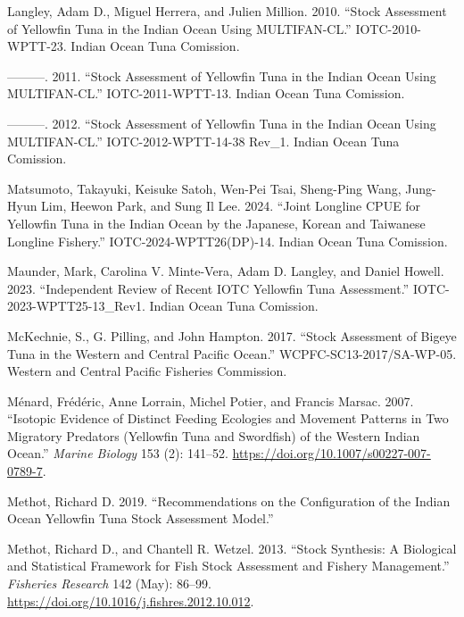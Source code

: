 \documentclass[
]{scrartcl}
\newlength{\cslhangindent}
\newenvironment{CSLReferences}[2] %
 {\begin{list}{}{%
  \setlength{\itemindent}{0pt}
  \setlength{\leftmargin}{0pt}
  \setlength{\parsep}{0pt}
  \ifodd #1
   \setlength{\leftmargin}{\cslhangindent}
   \setlength{\itemindent}{-1\cslhangindent}
  \fi
  \setlength{\itemsep}{#2\baselineskip}}}
 {\end{list}}
\begin{document}
\begin{CSLReferences}{1}{0}
Langley, Adam D., Miguel Herrera, and Julien Million. 2010. {``Stock
Assessment of Yellowfin Tuna in the {Indian Ocean} Using
{MULTIFAN-CL}.''} IOTC-2010-WPTT-23. Indian Ocean Tuna Comission.

---------. 2011. {``Stock Assessment of Yellowfin Tuna in the {Indian
Ocean} Using {MULTIFAN-CL}.''} IOTC-2011-WPTT-13. Indian Ocean Tuna
Comission.

---------. 2012. {``Stock Assessment of Yellowfin Tuna in the {Indian
Ocean} Using {MULTIFAN-CL}.''} IOTC-2012-WPTT-14-38 Rev\_1. Indian Ocean
Tuna Comission.

Matsumoto, Takayuki, Keisuke Satoh, Wen-Pei Tsai, Sheng-Ping Wang,
Jung-Hyun Lim, Heewon Park, and Sung Il Lee. 2024. {``Joint Longline
{CPUE} for Yellowfin Tuna in the {Indian Ocean} by the {Japanese},
{Korean} and {Taiwanese} Longline Fishery.''} IOTC-2024-WPTT26(DP)-14.
Indian Ocean Tuna Comission.

Maunder, Mark, Carolina V. Minte-Vera, Adam D. Langley, and Daniel
Howell. 2023. {``Independent Review of Recent {IOTC} Yellowfin Tuna
Assessment.''} IOTC-2023-WPTT25-13\_Rev1. Indian Ocean Tuna Comission.

McKechnie, S., G. Pilling, and John Hampton. 2017. {``Stock Assessment
of Bigeye Tuna in the Western and Central {Pacific Ocean}.''}
WCPFC-SC13-2017/SA-WP-05. {Western and Central Pacific Fisheries
Commission}.

Ménard, Frédéric, Anne Lorrain, Michel Potier, and Francis Marsac. 2007.
{``Isotopic Evidence of Distinct Feeding Ecologies and Movement Patterns
in Two Migratory Predators (Yellowfin Tuna and Swordfish) of the Western
{Indian Ocean}.''} \emph{Marine Biology} 153 (2): 141--52.
\url{https://doi.org/10.1007/s00227-007-0789-7}.

Methot, Richard D. 2019. {``Recommendations on the Configuration of the
{Indian Ocean} Yellowfin Tuna Stock Assessment Model.''}

Methot, Richard D., and Chantell R. Wetzel. 2013. {``Stock Synthesis:
{A} Biological and Statistical Framework for Fish Stock Assessment and
Fishery Management.''} \emph{Fisheries Research} 142 (May): 86--99.
\url{https://doi.org/10.1016/j.fishres.2012.10.012}.


\end{CSLReferences}
\end{document}
